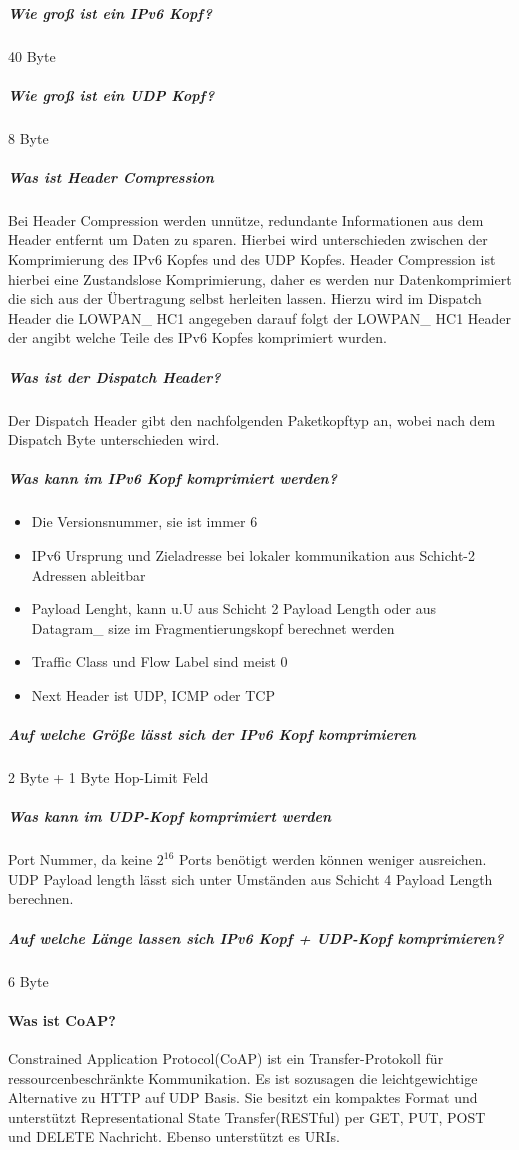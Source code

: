 	\subparagraph{Wie groß ist ein IPv6 Kopf?} 
	40 Byte
	
	\subparagraph{Wie groß ist ein UDP Kopf?}
	8 Byte
	
	\subparagraph{Was ist Header Compression}
	Bei Header Compression werden unnütze, redundante Informationen aus dem Header entfernt um Daten zu sparen. 
	Hierbei wird unterschieden zwischen der Komprimierung des IPv6 Kopfes und des UDP Kopfes.
	Header Compression ist hierbei eine Zustandslose Komprimierung, daher es werden nur Datenkomprimiert die sich aus der Übertragung selbst herleiten lassen.
	Hierzu wird im Dispatch Header die LOWPAN\_ HC1 angegeben darauf folgt der LOWPAN\_ HC1 Header der angibt welche Teile des IPv6 Kopfes komprimiert wurden.
	
	\subparagraph{Was ist der Dispatch Header?}
	Der Dispatch Header gibt den nachfolgenden Paketkopftyp an, wobei nach dem Dispatch Byte unterschieden wird.
	
	
	\subparagraph{Was kann im IPv6 Kopf komprimiert werden?}
		\begin{itemize}
			\item Die Versionsnummer, sie ist immer 6
			\item IPv6 Ursprung und Zieladresse bei lokaler kommunikation aus Schicht-2 Adressen ableitbar
			\item Payload Lenght, kann u.U aus Schicht 2 Payload Length oder aus Datagram\_ size im Fragmentierungskopf berechnet werden
			\item Traffic Class und Flow Label sind meist 0
			\item Next Header ist UDP, ICMP oder TCP
		\end{itemize}
			
		
		\subparagraph{Auf welche Größe lässt sich der IPv6 Kopf komprimieren}
		2 Byte + 1 Byte Hop-Limit Feld
		
	\subparagraph{Was kann im UDP-Kopf komprimiert werden}
	Port Nummer, da keine $2^{16}$ Ports benötigt werden können weniger ausreichen. UDP Payload length lässt sich unter Umständen aus Schicht 4 Payload Length berechnen.
	
	\subparagraph{Auf welche Länge  lassen sich IPv6 Kopf + UDP-Kopf komprimieren?}
	6 Byte
	
	\paragraph{Was ist CoAP?}
	Constrained Application Protocol(CoAP) ist ein Transfer-Protokoll für ressourcenbeschränkte Kommunikation. Es ist sozusagen die leichtgewichtige Alternative zu HTTP auf UDP Basis. Sie besitzt ein kompaktes Format und unterstützt Representational State Transfer(RESTful) per GET, PUT, POST und DELETE Nachricht. Ebenso unterstützt es URIs.
	
